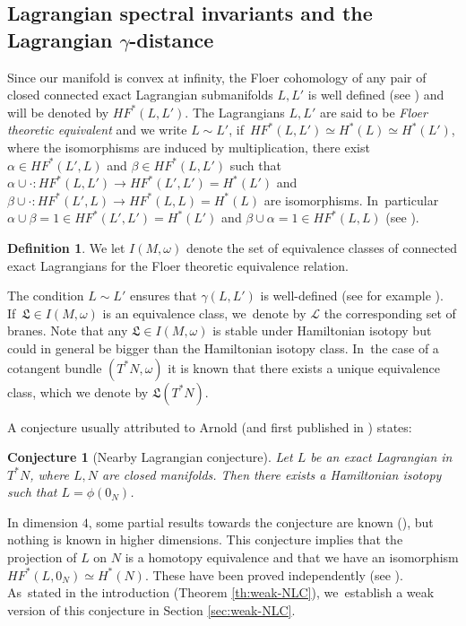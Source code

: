 \documentclass[10pt]{amsart}
\newtheorem{Conjecture}[thm]{Conjecture}
\theoremstyle{definition}
\newtheorem{defn}[thm]{Definition}
\newcommand {\LL}{{\mathcal L}}
\newcommand{\fL}{\mathfrak {L}}
\begin{document}
\subsection{Lagrangian spectral invariants and the Lagrangian \texorpdfstring{$\gamma$}{gamma}-distance}\label{sec:Lagrangian-spectral-inv}

Since our manifold is convex at infinity, the Floer cohomology of any pair of closed connected
exact Lagrangian submanifolds $L,L'$ is well defined (see \cite{Floer-Lag-intersection, McDuff-contact-boundaries, Viterbo-FunctorsI}) and will be denoted by $HF^*(L,L')$. The Lagrangians $L, L'$ are said to be \emph{Floer theoretic equivalent} and we write $L\sim L'$, if~$HF^*(L,L')\simeq
H^*(L)\simeq H^*(L')$, where the isomorphisms are induced by multiplication, \ie there exist $\alpha \in HF^*(L',L)$ and $\beta \in HF^*(L,L')$ such that $\alpha \cup\cdot : HF^*(L,L') \to HF^*(L',L')=H^*(L')$ and $\beta \cup \cdot : HF^*(L',L) \to HF^*(L,L)=H^*(L)$ are isomorphisms. In~particular $\alpha\cup \beta =1\in HF^*(L',L')=H^*(L')$ and $\beta \cup \alpha=1 \in HF^*(L,L)$ (see \cite[Def.\,3.5]{Abouzaid-Kragh}).

\begin{defn} We let $I(M,\omega)$ denote the set of equivalence classes of connected exact Lagrangians for the Floer theoretic equivalence relation.
\end{defn}

The condition $L\sim L'$ ensures that $\gamma(L,L')$ is well-defined (see for example \cite{shelukhin-sc-viterbo}). If~$\fL\in I(M,\omega)$ is an equivalence class, we~denote by $\LL$ the corresponding set of branes. Note that any $\fL\in I(M,\omega)$ is stable under Hamiltonian isotopy but could in general be bigger than the Hamiltonian isotopy class. In~the case of a cotangent bundle $(T^*N, \omega)$ it is known \cite{Fukaya-Seidel-Smith, Kragh-Abouzaid} that there exists a unique equivalence class, which we denote by $\fL(T^*N)$.

A conjecture usually attributed to Arnold (and first published in \cite{Lalonde-Sikorav}) states:
\begin{Conjecture}[Nearby Lagrangian conjecture]\label{conj:NLC}
Let $L$ be an exact Lagrangian in $T^{*}N$, where $L,N$ are closed manifolds. Then there exists a Hamiltonian isotopy such that $L=\phi (0_{N})$.
\end{Conjecture}
In dimension $4$, some partial results towards the conjecture are known (\cite{Eliashberg-Polterovich-local-2-knots, Hind, Kim-unknotedness, Dimitroglou-nearby-lagrangian}), but nothing is known in higher dimensions.
This conjecture implies that the projection of $L$ on $N$ is a homotopy equivalence and that we have an isomorphism $HF^{*}(L,0_{N})\simeq H^{*}(N)$. These have been proved independently (see \cite{Fukaya-Seidel-Smith, Kragh-Abouzaid}). As~stated in the introduction (Theorem \ref{th:weak-NLC}), we~establish a weak version of this conjecture in Section \ref{sec:weak-NLC}.
\end{document}
